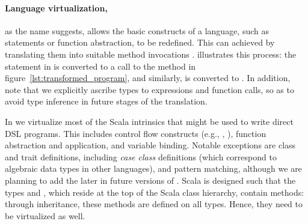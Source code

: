 \documentclass[paper.tex]{subfiles}
\begin{document}
\paragraph{Language virtualization,} as the name suggests, allows the basic constructs of a language, such as  statements or function abstraction, to be redefined.  This can achieved by translating them into suitable method invocations \cite{rompf_scala-virtualized:_2009}.  illustrates this process: the  statement in  is converted to a call to the  method in figure~\ref{lst:transformed_program}, and similarly,  is converted to .  In addition, note that we explicitly ascribe types to expressions and function calls, so as to avoid type inference in future stages of the translation.

In \tool we virtualize most of the Scala intrinsics that might be used to write direct DSL programs.  This includes control flow constructs (e.g., , ), function abstraction and application, and variable binding.  Notable exceptions are class and trait definitions, including \emph{case class} definitions (which correspond to algebraic data types in other languages), and pattern matching, although we are planning to add the later in future versions of \tool.  Scala is designed such that the types  and , which reside at the top of the Scala class hierarchy, contain  methods: through inheritance, these methods are defined on all types.  Hence, they need to be virtualized as well.
\end{document}
